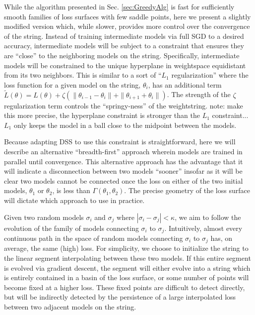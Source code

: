\documentclass[twocolumn,superscriptaddress,aps,prb,floatfix]{revtex4-1}
\begin{document}
  While the algorithm presented in Sec. \ref{sec:GreedyAlg} is fast for sufficiently smooth families of loss surfaces with few saddle points, here we present a slightly modified version which, while slower, provides more control over the convergence of the string.  Instead of training intermediate models via full SGD to a desired accuracy, intermediate models will be subject to a constraint that ensures they are ``close'' to the neighboring models on the string.  Specifically, intermediate models will be constrained to the unique hyperplane in weightspace equidistant from its two neighbors.  This is similar to a sort of ``$L_1$ regularization'' where the loss function for a given model on the string, $\theta_i$, has an additional term $\tilde{L}(\theta) = L(\theta)+\zeta(\|\theta_{i-1} - \theta_i\|+\|\theta_{i+1} + \theta_i\|)$.  The strength of the $\zeta$ regularization term controls the ``springy-ness'' of the weightstring. note: make this more precise, the hyperplane constraint is stronger than the $L_1$ constraint...$L_1$ only keeps the model in a ball close to the midpoint between the models.
  
  Because adapting DSS to use this constraint is straightforward, here we will describe an alternative ``breadth-first'' approach wherein models are trained in parallel until convergence.  This alternative approach has the advantage that it will indicate a disconnection between two models ``sooner'' insofar as it will be clear two models cannot be connected once the loss on either of the two initial models, $\theta_1$ or $\theta_2$, is less than $\Gamma(\theta_1, \theta_2)$.  The precise geometry of the loss surface will dictate which approach to use in practice.
  
  Given two random models $\sigma_i$ and $\sigma_j$ where $|\sigma_i - \sigma_j| < \kappa$, we aim to follow the evolution of the family of models connecting $\sigma_i$ to $\sigma_j$.  Intuitively, almost every continuous path in the space of random models connecting $\sigma_i$ to $\sigma_j$ has, on average, the same (high) loss.  For simplicity, we choose to initialize the string to the linear segment interpolating between these two models.  If this entire segment is evolved via gradient descent, the segment will either evolve into a string which is entirely contained in a basin of the loss surface, or some number of points will become fixed at a higher loss.  These fixed points are difficult to detect directly, but will be indirectly detected by the persistence of a large interpolated loss between two adjacent models on the string.
  
\end{document}
